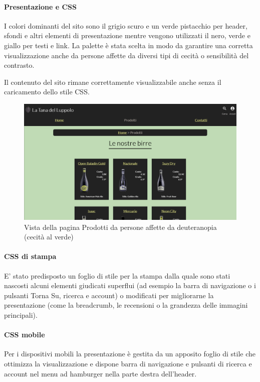 \paragraph{Presentazione e CSS}
I colori dominanti del sito sono il grigio scuro e un verde pistacchio per header, sfondi e altri elementi di presentazione mentre vengono utilizzati il nero, verde e giallo per testi e link.
La palette è stata scelta in modo da garantire una corretta visualizzazione anche da persone affette da diversi tipi di cecità o sensibilità del contrasto. 


Il contenuto del sito rimane correttamente visualizzabile anche senza il caricamento dello stile CSS.

\begin{figure}[H]
	\centering
	\includegraphics[width=16cm]{utility/prodotti_deuteranopia.png}
	\caption{Vista della pagina Prodotti da persone affette da deuteranopia (cecità al verde)}
\end{figure}

\paragraph{CSS di stampa}
E' stato predisposto un foglio di stile per la stampa dalla quale sono stati nascosti alcuni elementi giudicati superflui (ad esempio la barra di navigazione o i pulsanti Torna Su, ricerca e account) o modificati per migliorarne la presentazione (come la breadcrumb, le recensioni o la grandezza delle immagini principali).

\paragraph{CSS mobile}
Per i dispositivi mobili la presentazione è gestita da un apposito foglio di stile che ottimizza la visualizzazione e dispone barra di navigazione e pulsanti di ricerca e account nel menu ad hamburger nella parte destra dell'header.

